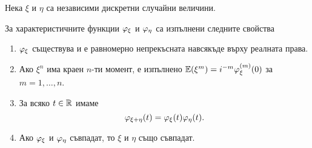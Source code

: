 \documentclass[numbers=endperiod, DIV=15, bibliography=totocnumbered]{scrartcl}
\begin{document}
\begin{theorem}
  Нека $\xi$ и $\eta$ са независими дискретни случайни величини.

  За характеристичните функции $\varphi_\xi$ и $\varphi_\eta$ са изпълнени следните свойства
  \begin{enumerate}
    \item $\varphi_\xi$ съществува и е равномерно непрекъсната навсякъде върху реалната права.

    \item Ако $\xi^n$ има краен $n$-ти момент, е изпълнено $\mathbb{E}(\xi^m) = i^{-m} \varphi_\xi^{(m)} (0)$ за $m = 1, \ldots, n$.

    \item За всяко $t \in \mathbb{R}$ имаме
    \begin{displaymath}
      \varphi_{\xi + \eta}(t) = \varphi_\xi(t) \varphi_\eta(t).
    \end{displaymath}

    \item Ако $\varphi_\xi$ и $\varphi_\eta$ съвпадат, то $\xi$ и $\eta$ също съвпадат.
  \end{enumerate}
\end{theorem}
\end{document}
